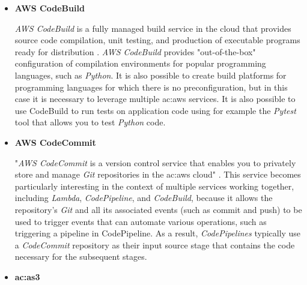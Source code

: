 \begin{itemize}
    \item[] \textbf{AWS CodeBuild}
    
    \textit{AWS CodeBuild} is a fully managed build service in the cloud that provides source code compilation, unit testing, and production of executable programs ready for distribution \cite{AWSCodebuild}. \textit{AWS CodeBuild} provides "out-of-the-box" configuration of compilation environments for popular programming languages, such as \textit{Python}. It is also possible to create build platforms for programming languages for which there is no preconfiguration, but in this case it is necessary to leverage multiple \gls{ac:aws} services. It is also possible to use CodeBuild to run tests on application code using for example the \textit{Pytest} tool that allows you to test \textit{Python} code.
    
    \item[] \textbf{AWS CodeCommit}
    
    "\textit{AWS CodeCommit} is a version control service that enables you to privately store and manage \textit{Git} repositories in the \gls{ac:aws} cloud" \cite{AWSCodecommit}. This service becomes particularly interesting in the context of multiple services working together, including \textit{Lambda}, \textit{CodePipeline}, and \textit{CodeBuild}, because it allows the repository's \textit{Git} and all its associated events (such as commit and push) to be used to trigger events that can automate various operations, such as triggering a pipeline in CodePipeline. As a result, \textit{CodePipelines} typically use a \textit{CodeCommit} repository as their input source stage that contains the code necessary for the subsequent stages.
    
    \item[] \textbf{\gls{ac:as3}}
    

\end{itemize}
